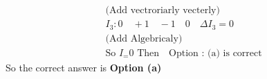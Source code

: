 \begin{enumerate}
\begin{answer}
$$\begin{aligned}
&\text{(Add vectroriarly vecterly)}\\
&I_3: 0 \quad+1 \quad-1 \quad 0 \quad \Delta I_3=0\\
&\text{(Add Algebricaly)}\\
&\text{So }I_=0\text{ Then$\quad$
Option : (a) is correct}
\end{aligned}
$$
So the correct answer is \textbf{Option (a)}
\end{answer}
	
	
	
	
	
	
	
	
	
	
	
	
	
	
	
	
	
	
	
	
	
	
	
	
	
	
	
	
	
	
	
	
	
	
\end{enumerate}